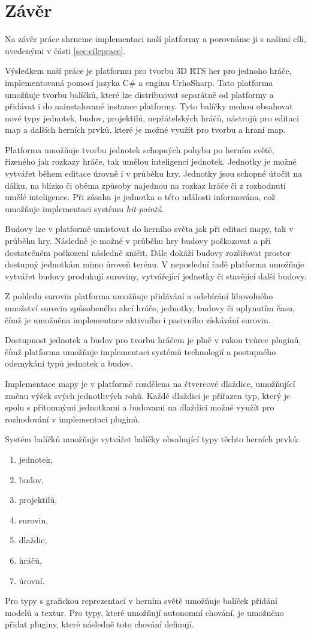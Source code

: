 \chapter*{Závěr}
Na závěr práce shrneme implementaci naší platformy a porovnáme ji s našimi cíli, uvedenými v části \ref{sec:cileprace}.

Výsledkem naší práce je platformu pro tvorbu 3D RTS her pro jednoho hráče, implementovaná pomocí jazyka C\# a enginu UrhoSharp. Tato platforma umožňuje tvorbu balíčků, které lze distribuovat separátně od platformy a přidávat i do nainstalované instance platformy. Tyto balíčky mohou obsahovat nové typy jednotek, budov, projektilů, nepřátelských hráčů, nástrojů pro editaci map a dalších herních prvků, které je možné využít pro tvorbu a hraní map. 

Platforma umožňuje tvorbu jednotek schopných pohybu po herním světě, řízeného jak rozkazy hráče, tak umělou inteligencí jednotek. Jednotky je možné vytvářet během editace úrovně i v průběhu hry. Jednotky jsou schopné útočit na dálku, na blízko či oběma způsoby najednou na rozkaz hráče či z rozhodnutí umělé inteligence. Při zásahu je jednotka o této události informována, což umožňuje implementaci systému \textit{hit-pointů}.

Budovy lze v platformě umisťovat do herního světa jak při editaci mapy, tak v průběhu hry. Následně je možné v průběhu hry budovy poškozovat a při dostatečném poškození následně zničit. Dále dokáží budovy rozšiřovat prostor dostupný jednotkám mimo úroveň terénu. V neposlední řadě platforma umožňuje vytvářet budovy produkují suroviny, vytvářející jednotky či stavějící další budovy.

Z pohledu surovin platforma umožňuje přidávání a odebírání libovolného množství surovin způsobeného akcí hráče, jednotky, budovy či uplynutím času, čímž je umožněna implementace aktivního i pasivního získávání surovin.

Dostupnost jednotek a budov pro tvorbu hráčem je plně v rukou tvůrce pluginů, čímž platforma umožňuje implementaci systémů technologií a postupného odemykání typů jednotek a budov.

Implementace mapy je v platformě rozdělena na čtvercové dlaždice, umožňující změnu výšek svých jednotlivých rohů. Každé dlaždici je přiřazen typ, který je spolu s přítomnými jednotkami a budovami na dlaždici možné využít pro rozhodování v implementaci pluginů.

Systém balíčků umožňuje vytvářet balíčky obsahující typy těchto herních prvků:
\begin{enumerate}
	\item jednotek,
	\item budov,
	\item projektilů,
	\item surovin,
	\item dlaždic,
	\item hráčů,
	\item úrovní.	
\end{enumerate} 
Pro typy s grafickou reprezentací v herním světě umožňuje balíček přidání modelů a textur. Pro typy, které umožňují autonomní chování, je umožněno přidat pluginy, které následně toto chování definují.


